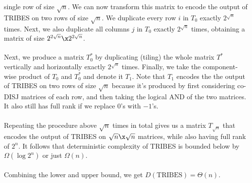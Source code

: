 \documentclass{article}
\begin{document}
\begin{enumerate}
\begin{enumerate}[label=(\alph*)]
                single row of size $\sqrt{n}$. We can now transform this matrix
                to encode the output of TRIBES on two rows of size $\sqrt{n}$.
                We duplicate every row $i$ in $T_0$ exactly $2^{\sqrt{n}}$
                times. Next, we also duplicate all columns $j$ in $T_0$ exactly
                $2^{\sqrt{n}}$ times, obtaining a matrix of size $2^{2\sqrt{n}}
                \x 2^{2\sqrt{n}}$.
                \\\\
                Next, we produce a matrix $T_0^*$ by duplicating (tiling) the
                whole matrix $T^*$ vertically and horizontally exactly
                $2^{\sqrt{n}}$ times. Finally, we take the component-wise
                product of $T_0$ and $T_0^*$ and denote it $T_1$. Note that
                $T_1$ encodes the the output of TRIBES on two rows of size
                $\sqrt{n}$ because it's produced by first considering co-DISJ
                matrices of each row, and then taking the logical AND of the
                two matrices. It also still has full rank if we replace $0$'s
                with $-1$'s.
                \\\\
                Repeating the procedure above $\sqrt{n}$ times in total gives
                us a matrix $T_{\sqrt{n}}$ that encodes the output of
                TRIBES on $\sqrt{n} \x \sqrt{n}$ matrices, while also having
                full rank of $2^n$. It follows that deterministic complexity of
                TRIBES is bounded below by $\Omega(\log 2^n)$ or  just
                $\Omega(n)$.
                \\\\
                Combining the lower and upper bound, we get
                $D(\textrm{TRIBES}) = \Theta(n)$.
                \\
                

\end{enumerate}
\end{enumerate}
\end{document}
